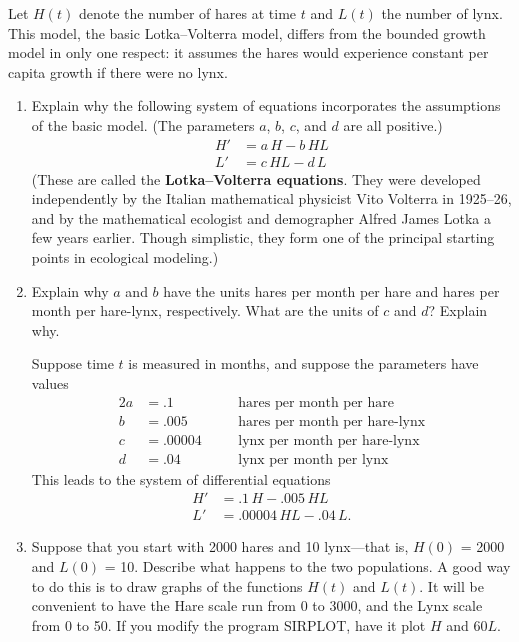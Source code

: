 \begin{enumerate}
	Let  $H(t)$ denote the number of hares at time $t$ and $L(t)$ the number of lynx.  This model, the basic Lotka--Volterra model, differs from the bounded growth model in only one respect: it assumes the hares would experience constant per capita growth if there were no lynx.

  \begin{enumerate}
  \item Explain why the following system of equations incorporates the assumptions of the basic model.  (The parameters $a$, $b$, $c$,  and  $d$ are all positive.)
\begin{align*}
 H' & =  a\,H  -  b\,HL  \\
 L' & =  c\,HL - d\,L
\end{align*}
(These are called the {\bf Lotka--Volterra equations}.  They were developed independently by the Italian mathematical physicist Vito Volterra in 1925--26, and 
by the mathematical ecologist and demographer Alfred James Lotka a few years earlier.  Though simplistic, they form one of the principal starting points in ecological modeling.)


  \item Explain why $a$ and $b$ have the units hares per month per hare and hares per month per hare-lynx, respectively.  What are the units of $c$ and $d$?  Explain why.



Suppose time $t$ is measured in months, and suppose the parameters
have values
\begin{alignat*}{2}
a &= .1 &     &\mbox{hares per month per hare} \\
b &= .005 &   &\mbox{hares per month per hare-lynx} \\ 
c &= .00004 &\quad  &\mbox{lynx per month per hare-lynx}\\ 
d &= .04 &    &\mbox{lynx per month per lynx} 
\end{alignat*}
This leads to the system of differential equations 
\begin{align*}
	H' & =  .1\,H - .005\,HL   \\
	L' & =  .00004\,HL - .04\,L.
 \end{align*}


  \item Suppose that you start with 2000 hares and 10
lynx---that is, $H(0)$ = 2000 and $L(0)$ = 10.  Describe what happens to the two populations.  A good way to do this is to draw graphs of the functions $H(t)$ and $L(t)$.  It will be convenient to have the Hare scale run from 0 to 3000, and the Lynx scale from 0 to 50.  If you modify the program SIRPLOT, have it plot $H$ and $60L$.


\end{enumerate}
\end{enumerate}
